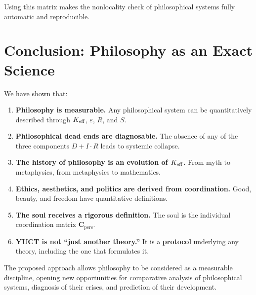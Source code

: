 \documentclass[12pt,a4paper]{article}
\newcommand{\eps}{\varepsilon}
\newcommand{\Cpers}{\mathbf{C}_{\text{pers}}}
\begin{document}
	Using this matrix makes the nonlocality check of philosophical systems fully automatic and reproducible.
	
	
	\section{Conclusion: Philosophy as an Exact Science}
	
	We have shown that:
	
	\begin{enumerate}
		\item \textbf{Philosophy is measurable.} Any philosophical system can be quantitatively described through \(\Keff\), \(\eps\), \(R\), and \(S\).
		\item \textbf{Philosophical dead ends are diagnosable.} The absence of any of the three components \(D + I \cdot R\) leads to systemic collapse.
		\item \textbf{The history of philosophy is an evolution of \(\Keff\).} From myth to metaphysics, from metaphysics to mathematics.
		\item \textbf{Ethics, aesthetics, and politics are derived from coordination.} Good, beauty, and freedom have quantitative definitions.
		\item \textbf{The soul receives a rigorous definition.} The soul is the individual coordination matrix \(\Cpers\).
		\item \textbf{YUCT is not ``just another theory.''} It is a \textbf{protocol} underlying any theory, including the one that formulates it.
	\end{enumerate}
	
	The proposed approach allows philosophy to be considered as a measurable discipline, opening new opportunities for comparative analysis of philosophical systems, diagnosis of their crises, and prediction of their development.
	
	\begin{center}
	\end{center}
	
\end{document}
